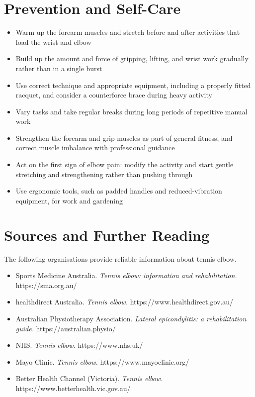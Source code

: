 \section*{Prevention and Self-Care}
\begin{itemize}
    \item Warm up the forearm muscles and stretch before and after activities that load the wrist and elbow
    \item Build up the amount and force of gripping, lifting, and wrist work gradually rather than in a single burst
    \item Use correct technique and appropriate equipment, including a properly fitted racquet, and consider a counterforce brace during heavy activity
    \item Vary tasks and take regular breaks during long periods of repetitive manual work
    \item Strengthen the forearm and grip muscles as part of general fitness, and correct muscle imbalance with professional guidance
    \item Act on the first sign of elbow pain: modify the activity and start gentle stretching and strengthening rather than pushing through
    \item Use ergonomic tools, such as padded handles and reduced-vibration equipment, for work and gardening
\end{itemize}

\section*{Sources and Further Reading}
The following organisations provide reliable information about tennis elbow.

\begin{itemize}
    \item Sports Medicine Australia. \textit{Tennis elbow: information and rehabilitation.} https://sma.org.au/
    \item healthdirect Australia. \textit{Tennis elbow.} https://www.healthdirect.gov.au/
    \item Australian Physiotherapy Association. \textit{Lateral epicondylitis: a rehabilitation guide.} https://australian.physio/
    \item NHS. \textit{Tennis elbow.} https://www.nhs.uk/
    \item Mayo Clinic. \textit{Tennis elbow.} https://www.mayoclinic.org/
    \item Better Health Channel (Victoria). \textit{Tennis elbow.} https://www.betterhealth.vic.gov.au/
\end{itemize}

\clearpage
